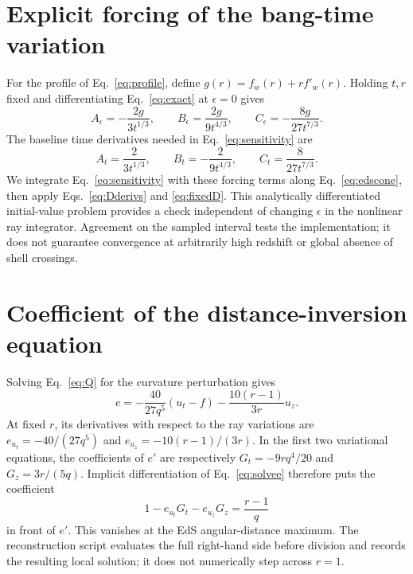\documentclass[11pt]{article}
\begin{document}
\appendix
\section{Explicit forcing of the bang-time variation}\label{sec:forcing}
For the profile of Eq.~\eqref{eq:profile}, define $g(r)=f_w(r)+r f'_w(r)$. Holding $t,r$ fixed and differentiating Eq.~\eqref{eq:exact} at $\epsilon=0$ gives
\begin{equation}
A_\epsilon=-\frac{2g}{3t^{1/3}},\qquad
B_\epsilon=\frac{2g}{9t^{4/3}},\qquad
C_\epsilon=-\frac{8g}{27t^{7/3}}.\label{eq:forcing}
\end{equation}
The baseline time derivatives needed in Eq.~\eqref{eq:sensitivity} are
\begin{equation}
A_t=\frac{2}{3t^{1/3}},\qquad
B_t=-\frac{2}{9t^{4/3}},\qquad
C_t=\frac{8}{27t^{7/3}}.\label{eq:timeforcing}
\end{equation}
We integrate Eq.~\eqref{eq:sensitivity} with these forcing terms along Eq.~\eqref{eq:edscone}, then apply Eqs.~\eqref{eq:Dderivs} and \eqref{eq:fixedD}. This analytically differentiated initial-value problem provides a check independent of changing $\epsilon$ in the nonlinear ray integrator. Agreement on the sampled interval tests the implementation; it does not guarantee convergence at arbitrarily high redshift or global absence of shell crossings.

\section{Coefficient of the distance-inversion equation}
Solving Eq.~\eqref{eq:Q} for the curvature perturbation gives
\begin{equation}
e=-\frac{40}{27q^5}(u_t-f)-\frac{10(r-1)}{3r}u_z.\label{eq:solvee}
\end{equation}
At fixed $r$, its derivatives with respect to the ray variations are $e_{u_t}=-40/(27q^5)$ and $e_{u_z}=-10(r-1)/(3r)$. In the first two variational equations, the coefficients of $e'$ are respectively $G_t=-9rq^4/20$ and $G_z=3r/(5q)$. Implicit differentiation of Eq.~\eqref{eq:solvee} therefore puts the coefficient
\begin{equation}
1-e_{u_t}G_t-e_{u_z}G_z=\frac{r-1}{q}\label{eq:singular}
\end{equation}
in front of $e'$. This vanishes at the EdS angular-distance maximum. The reconstruction script evaluates the full right-hand side before division and records the resulting local solution; it does not numerically step across $r=1$.
\end{document}
